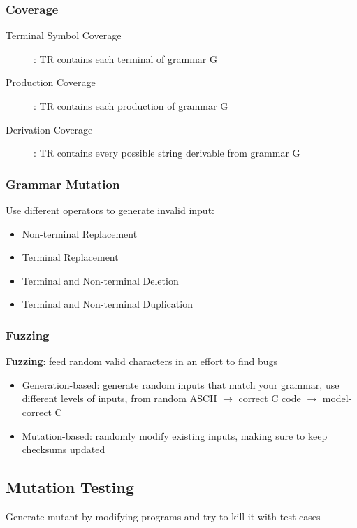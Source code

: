 \documentclass[]{article}
\theoremstyle{definition}
\begin{document}
			\subsubsection{Coverage}
				\begin{description}
					\item[Terminal Symbol Coverage]: TR contains each terminal of grammar G
					\item[Production Coverage]: TR contains each production of grammar G
					\item[Derivation Coverage]: TR contains every possible string derivable from grammar G
				\end{description}
				\subsubsection{Grammar Mutation}
					Use different operators to generate invalid input:
					\begin{itemize}
						\item Non-terminal Replacement
						\item Terminal Replacement
						\item Terminal and Non-terminal Deletion
						\item Terminal and Non-terminal Duplication
					\end{itemize}
				\subsubsection{Fuzzing}
					\textbf{Fuzzing}: feed random valid characters in an effort to find bugs 

					\begin{itemize}
						\item Generation-based: generate random inputs that match your grammar, use different levels of inputs, from random ASCII $\rightarrow$ correct C code $\rightarrow$ model-correct C
						\item Mutation-based: randomly modify existing inputs, making sure to keep checksums updated
					\end{itemize}
			\subsection{Mutation Testing}
				Generate mutant by modifying programs and try to kill it with test cases 
\end{document}
